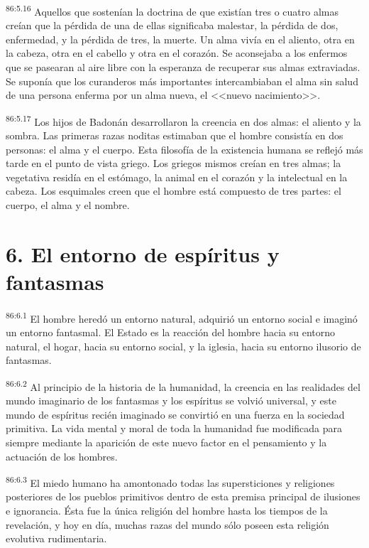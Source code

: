 \documentclass[twoside, 11pt]{book}
\begin{document}
\par
\textsuperscript{86:5.16} Aquellos que sostenían la doctrina de que existían tres o cuatro almas creían que la pérdida de una de ellas significaba malestar, la pérdida de dos, enfermedad, y la pérdida de tres, la muerte. Un alma vivía en el aliento, otra en la cabeza, otra en el cabello y otra en el corazón. Se aconsejaba a los enfermos que se pasearan al aire libre con la esperanza de recuperar sus almas extraviadas. Se suponía que los curanderos más importantes intercambiaban el alma sin salud de una persona enferma por un alma nueva, el <<nuevo nacimiento>>.

\par
\textsuperscript{86:5.17} Los hijos de Badonán desarrollaron la creencia en dos almas: el aliento y la sombra. Las primeras razas noditas estimaban que el hombre consistía en dos personas: el alma y el cuerpo. Esta filosofía de la existencia humana se reflejó más tarde en el punto de vista griego. Los griegos mismos creían en tres almas; la vegetativa residía en el estómago, la animal en el corazón y la intelectual en la cabeza. Los esquimales creen que el hombre está compuesto de tres partes: el cuerpo, el alma y el nombre.

\section*{6. El entorno de espíritus y fantasmas}
\par
\textsuperscript{86:6.1} El hombre heredó un entorno natural, adquirió un entorno social e imaginó un entorno fantasmal. El Estado es la reacción del hombre hacia su entorno natural, el hogar, hacia su entorno social, y la iglesia, hacia su entorno ilusorio de fantasmas.

\par
\textsuperscript{86:6.2} Al principio de la historia de la humanidad, la creencia en las realidades del mundo imaginario de los fantasmas y los espíritus se volvió universal, y este mundo de espíritus recién imaginado se convirtió en una fuerza en la sociedad primitiva. La vida mental y moral de toda la humanidad fue modificada para siempre mediante la aparición de este nuevo factor en el pensamiento y la actuación de los hombres.

\par
\textsuperscript{86:6.3} El miedo humano ha amontonado todas las supersticiones y religiones posteriores de los pueblos primitivos dentro de esta premisa principal de ilusiones e ignorancia. Ésta fue la única religión del hombre hasta los tiempos de la revelación, y hoy en día, muchas razas del mundo sólo poseen esta religión evolutiva rudimentaria.
\end{document}
